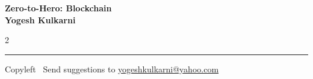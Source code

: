 \documentclass[8pt,landscape]{article}
\begin{document}
\footnotesize


\begin{center}
\Large{\textbf{Zero-to-Hero: Blockchain\\ Yogesh Kulkarni}}  
\end{center}

\begin{multicols}{2}

\end{multicols}

\rule{\linewidth}{0.25pt}
\scriptsize
Copyleft \textcopyleft\  Send suggestions to 
\href{http://www.yogeshkulkarni.com}{yogeshkulkarni@yahoo.com}
\end{document}
